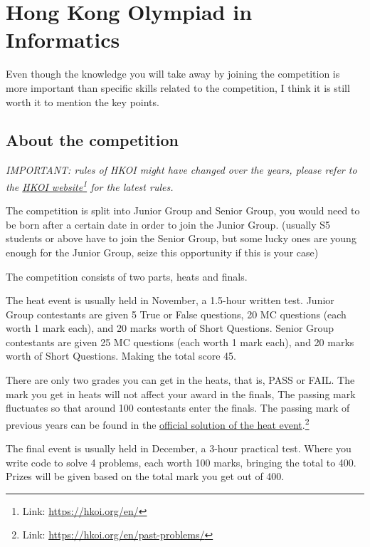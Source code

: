 \chapter{Hong Kong Olympiad in Informatics}

Even though the knowledge you will take away by joining the competition is more important than specific skills related to the competition, I think it is still worth it to mention the key points.

\section{About the competition}
\textit{IMPORTANT: rules of HKOI might have changed over the years, please refer to the \href{https://hkoi.org/en/}{HKOI website}\footnote{Link: \href{https://hkoi.org/en/}{https://hkoi.org/en/}} for the latest rules.}
\vspace{6mm}

The competition is split into Junior Group and Senior Group, you would need to be born after a certain date in order to join the Junior Group. (usually S5 students or above have to join the Senior Group, but some lucky ones are young enough for the Junior Group, seize this opportunity if this is your case)
\vspace{6mm}

The competition consists of two parts, heats and finals.
\vspace{6mm}

The heat event is usually held in November, a 1.5-hour written test. Junior Group contestants are given 5 True or False questions, 20 MC questions (each worth 1 mark each), and 20 marks worth of Short Questions. Senior Group contestants are given 25 MC questions (each worth 1 mark each), and 20 marks worth of Short Questions. Making the total score 45. 

There are only two grades you can get in the heats, that is, PASS or FAIL. The mark you get in heats will not affect your award in the finals, The passing mark fluctuates so that around 100 contestants enter the finals. The passing mark of previous years can be found in the \href{https://hkoi.org/en/past-problems/}{official solution of the heat event}.\footnote{Link: \href{https://hkoi.org/en/past-problems/}{https://hkoi.org/en/past-problems/}}
\vspace{6mm}

The final event is usually held in December, a 3-hour practical test. Where you write code to solve 4 problems, each worth 100 marks, bringing the total to 400. Prizes will be given based on the total mark you get out of 400.
\vspace{6mm}

